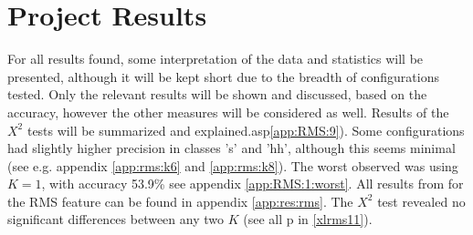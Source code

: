 
\section{Project Results}
	
	For all results found, some interpretation of the data and statistics will be presented, although it will be kept short due to the breadth of configurations tested. Only the relevant results will be shown and discussed, based on the accuracy, however the other measures will be considered as well. Results of the $X^2$ tests will be summarized and explained.asp\ref{app:RMS:9}). Some configurations had slightly higher precision in classes 's' and 'hh', although this seems minimal (see e.g. appendix  \ref{app:rms:k6} and \ref{app:rms:k8}). The worst observed was using $K=1$, with accuracy 53.9\% see appendix \ref{app:RMS:1:worst}. All results from for the RMS feature can be found in appendix \ref{app:res:rms}. The $X^2$ test revealed no significant differences between any two $K$ (see all p in \ref{xlrms11}).

		
	
